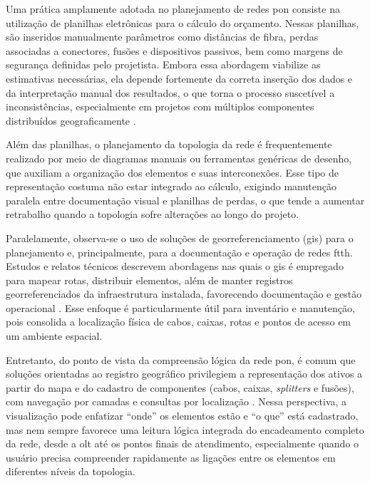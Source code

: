 Uma prática amplamente adotada no planejamento de redes \gls{pon} consiste na utilização de planilhas eletrônicas para o cálculo do orçamento. Nessas planilhas, são inseridos manualmente parâmetros como distâncias de fibra, perdas associadas a conectores, fusões e dispositivos passivos, bem como margens de segurança definidas pelo projetista. Embora essa abordagem viabilize as estimativas necessárias, ela depende fortemente da correta inserção dos dados e da interpretação manual dos resultados, o que torna o processo suscetível a inconsistências, especialmente em projetos com múltiplos componentes distribuídos geograficamente \cite{keiser2011pon}. 

Além das planilhas, o planejamento da topologia da rede é frequentemente realizado por meio de diagramas manuais ou ferramentas genéricas de desenho, que auxiliam a organização dos elementos e suas interconexões. Esse tipo de representação costuma não estar integrado ao cálculo, exigindo manutenção paralela entre documentação visual e planilhas de perdas, o que tende a aumentar retrabalho quando a topologia sofre alterações ao longo do projeto.

Paralelamente, observa-se o uso de soluções de georreferenciamento (\gls{gis}) para o planejamento e, principalmente, para a documentação e operação de redes \gls{ftth}. Estudos e relatos técnicos descrevem abordagens nas quais o \gls{gis} é empregado para mapear rotas, distribuir elementos, além de manter registros georreferenciados da infraestrutura instalada, favorecendo documentação e gestão operacional \cite{chakali2025gis_ftth,vargas2025gis_ecuador,irjet2017ftth_gis_autocad,qgis2016ftth_case}. Esse enfoque é particularmente útil para inventário e manutenção, pois consolida a localização física de cabos, caixas, rotas e pontos de acesso em um ambiente espacial.

Entretanto, do ponto de vista da compreensão lógica da rede \gls{pon}, é comum que soluções orientadas ao registro geográfico privilegiem a representação dos ativos a partir do mapa e do cadastro de componentes (cabos, caixas, \textit{splitters} e fusões), com navegação por camadas e consultas por localização \cite{chakali2025gis_ftth,vargas2025gis_ecuador}. Nessa perspectiva, a visualização pode enfatizar ``onde'' os elementos estão e ``o que'' está cadastrado, mas nem sempre favorece uma leitura lógica integrada do encadeamento completo da rede, desde a \gls{olt} até os pontos finais de atendimento, especialmente quando o usuário precisa compreender rapidamente as ligações entre os elementos em diferentes níveis da topologia.

